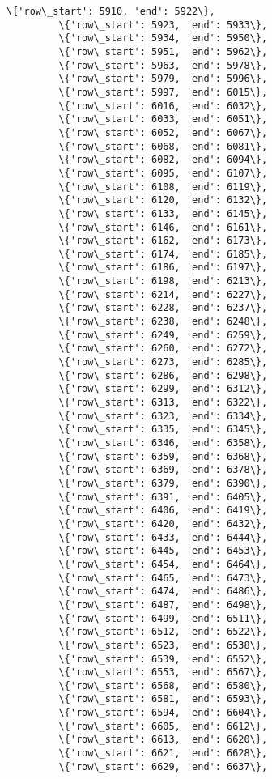 \documentclass[11pt]{article}
\begin{document}
\begin{Verbatim}[commandchars=\\\{\}]
         \{'row\_start': 5910, 'end': 5922\},
         \{'row\_start': 5923, 'end': 5933\},
         \{'row\_start': 5934, 'end': 5950\},
         \{'row\_start': 5951, 'end': 5962\},
         \{'row\_start': 5963, 'end': 5978\},
         \{'row\_start': 5979, 'end': 5996\},
         \{'row\_start': 5997, 'end': 6015\},
         \{'row\_start': 6016, 'end': 6032\},
         \{'row\_start': 6033, 'end': 6051\},
         \{'row\_start': 6052, 'end': 6067\},
         \{'row\_start': 6068, 'end': 6081\},
         \{'row\_start': 6082, 'end': 6094\},
         \{'row\_start': 6095, 'end': 6107\},
         \{'row\_start': 6108, 'end': 6119\},
         \{'row\_start': 6120, 'end': 6132\},
         \{'row\_start': 6133, 'end': 6145\},
         \{'row\_start': 6146, 'end': 6161\},
         \{'row\_start': 6162, 'end': 6173\},
         \{'row\_start': 6174, 'end': 6185\},
         \{'row\_start': 6186, 'end': 6197\},
         \{'row\_start': 6198, 'end': 6213\},
         \{'row\_start': 6214, 'end': 6227\},
         \{'row\_start': 6228, 'end': 6237\},
         \{'row\_start': 6238, 'end': 6248\},
         \{'row\_start': 6249, 'end': 6259\},
         \{'row\_start': 6260, 'end': 6272\},
         \{'row\_start': 6273, 'end': 6285\},
         \{'row\_start': 6286, 'end': 6298\},
         \{'row\_start': 6299, 'end': 6312\},
         \{'row\_start': 6313, 'end': 6322\},
         \{'row\_start': 6323, 'end': 6334\},
         \{'row\_start': 6335, 'end': 6345\},
         \{'row\_start': 6346, 'end': 6358\},
         \{'row\_start': 6359, 'end': 6368\},
         \{'row\_start': 6369, 'end': 6378\},
         \{'row\_start': 6379, 'end': 6390\},
         \{'row\_start': 6391, 'end': 6405\},
         \{'row\_start': 6406, 'end': 6419\},
         \{'row\_start': 6420, 'end': 6432\},
         \{'row\_start': 6433, 'end': 6444\},
         \{'row\_start': 6445, 'end': 6453\},
         \{'row\_start': 6454, 'end': 6464\},
         \{'row\_start': 6465, 'end': 6473\},
         \{'row\_start': 6474, 'end': 6486\},
         \{'row\_start': 6487, 'end': 6498\},
         \{'row\_start': 6499, 'end': 6511\},
         \{'row\_start': 6512, 'end': 6522\},
         \{'row\_start': 6523, 'end': 6538\},
         \{'row\_start': 6539, 'end': 6552\},
         \{'row\_start': 6553, 'end': 6567\},
         \{'row\_start': 6568, 'end': 6580\},
         \{'row\_start': 6581, 'end': 6593\},
         \{'row\_start': 6594, 'end': 6604\},
         \{'row\_start': 6605, 'end': 6612\},
         \{'row\_start': 6613, 'end': 6620\},
         \{'row\_start': 6621, 'end': 6628\},
         \{'row\_start': 6629, 'end': 6637\},

\end{Verbatim}
\end{document}
